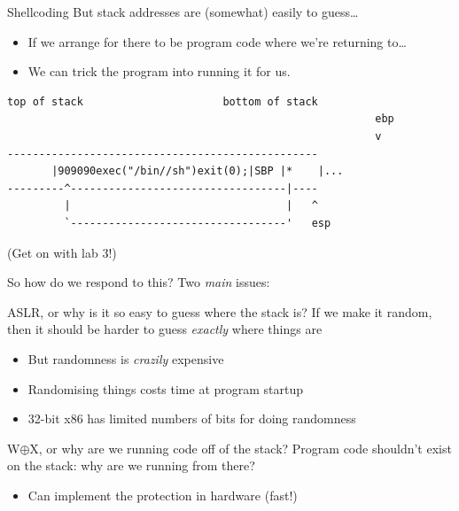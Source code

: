 \documentclass[9pt,aspectratio=169]{beamer}
\begin{document}
\begin{frame}[label={sec:orgb147260},fragile]{Shellcoding}
 But stack addresses are (somewhat) easily to guess\ldots{}
\begin{itemize}
\item If we arrange for there to be program code where we're returning to\ldots{}
\item We can trick the program into running it for us.
\end{itemize}

\begin{verbatim}
top of stack                      bottom of stack
                                                          ebp
                                                          v
-------------------------------------------------
       |909090exec("/bin//sh")exit(0);|SBP |*    |...
---------^----------------------------------|----
         |                                  |   ^
         `----------------------------------'   esp
\end{verbatim}

(Get on with lab 3!)
\end{frame}

\begin{frame}[label={sec:org941f4d7}]{So how do we respond to this?}
Two \emph{main} issues:

\begin{block}{ASLR, or why is it so easy to guess where the stack is?}
If we make it random, then it should be harder to guess \emph{exactly} where things are
\begin{itemize}
\item But randomness is \emph{crazily} expensive
\item Randomising things costs time at program startup
\item 32-bit x86 has limited numbers of bits for doing randomness
\end{itemize}
\end{block}

\begin{block}{W\(\oplus\)X, or why are we running code off of the stack?}
Program code shouldn't exist on the stack: why are we running from there?
\begin{itemize}
\item Can implement the protection in hardware (fast!)
\end{itemize}
\end{block}
\end{frame}
\end{document}
